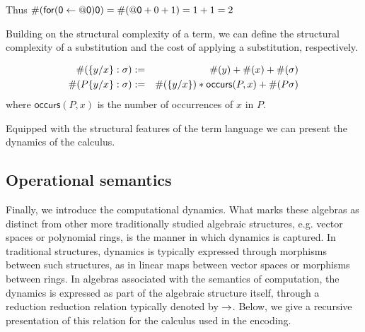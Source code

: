 \begin{example}
  Thus $\#(\mathsf{for(}\mathsf{0} \leftarrow \mathsf{@} \mathsf{0} \mathsf{)} \mathsf{0}) = \#(\mathsf{@} \mathsf{0} + 0 + 1) = 1 + 1 = 2$
\end{example}

Building on the structural complexity of a term, we can define the
structural complexity of a substitution and the cost of applying a
substitution, respectively.

\begin{definition}
  \begin{eqnarray}
    \#(\{ y / x \}:\sigma) & := & \#(y) + \#(x) + \#(\sigma) \nonumber \\
    \#(P\{ y / x \}:\sigma) & := & \#(\{ y / x \}) * \mathsf{occurs}(P,x) + \#(P\sigma) \nonumber
  \end{eqnarray}
  where $\mathsf{occurs}(P,x)$ is the number of occurrences of $x$ in $P$.
\end{definition}

Equipped with the structural features of the term language we can
present the dynamics of the calculus.

\subsection{Operational semantics}

Finally, we introduce the computational dynamics. What marks these
algebras as distinct from other more traditionally studied algebraic
structures, e.g. vector spaces or polynomial rings, is the manner in
which dynamics is captured. In traditional structures, dynamics is typically
expressed through morphisms between such structures, as in linear maps
between vector spaces or morphisms between rings. In algebras
associated with the semantics of computation, the dynamics is
expressed as part of the algebraic structure itself, through a
reduction reduction relation typically denoted by $\rightarrow$. Below, we
give a recursive presentation of this relation for the calculus used
in the encoding.


